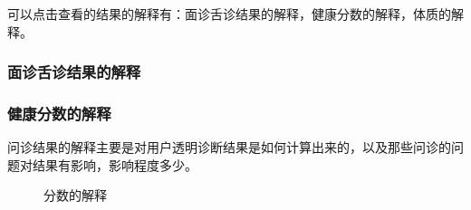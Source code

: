 可以点击查看的结果的解释有：面诊舌诊结果的解释，健康分数的解释，体质的解释。

\subsubsection{面诊舌诊结果的解释}

\subsubsection{健康分数的解释}
问诊结果的解释主要是对用户透明诊断结果是如何计算出来的，以及那些问诊的问题对结果有影响，影响程度多少。

\begin{figure}[h]
    \centering
    \caption{分数的解释}
    \label{fig:report_expalin_score}
\end{figure}

